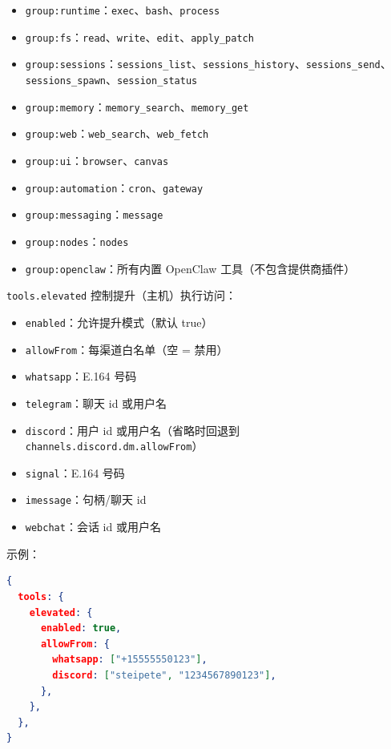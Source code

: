 \begin{itemize}
  \item \texttt{group:runtime}：\texttt{exec}、\texttt{bash}、\texttt{process}
  \item \texttt{group:fs}：\texttt{read}、\texttt{write}、\texttt{edit}、\texttt{apply\_patch}
  \item \texttt{group:sessions}：\texttt{sessions\_list}、\texttt{sessions\_history}、\texttt{sessions\_send}、\texttt{sessions\_spawn}、\texttt{session\_status}
  \item \texttt{group:memory}：\texttt{memory\_search}、\texttt{memory\_get}
  \item \texttt{group:web}：\texttt{web\_search}、\texttt{web\_fetch}
  \item \texttt{group:ui}：\texttt{browser}、\texttt{canvas}
  \item \texttt{group:automation}：\texttt{cron}、\texttt{gateway}
  \item \texttt{group:messaging}：\texttt{message}
  \item \texttt{group:nodes}：\texttt{nodes}
  \item \texttt{group:openclaw}：所有内置 OpenClaw 工具（不包含提供商插件）
\end{itemize}


\texttt{tools.elevated} 控制提升（主机）执行访问：

\begin{itemize}
  \item \texttt{enabled}：允许提升模式（默认 true）
  \item \texttt{allowFrom}：每渠道白名单（空 = 禁用）
  \item \texttt{whatsapp}：E.164 号码
  \item \texttt{telegram}：聊天 id 或用户名
  \item \texttt{discord}：用户 id 或用户名（省略时回退到 \texttt{channels.discord.dm.allowFrom}）
  \item \texttt{signal}：E.164 号码
  \item \texttt{imessage}：句柄/聊天 id
  \item \texttt{webchat}：会话 id 或用户名
\end{itemize}


示例：

\begin{lstlisting}[language=json]
{
  tools: {
    elevated: {
      enabled: true,
      allowFrom: {
        whatsapp: ["+15555550123"],
        discord: ["steipete", "1234567890123"],
      },
    },
  },
}
\end{lstlisting}


